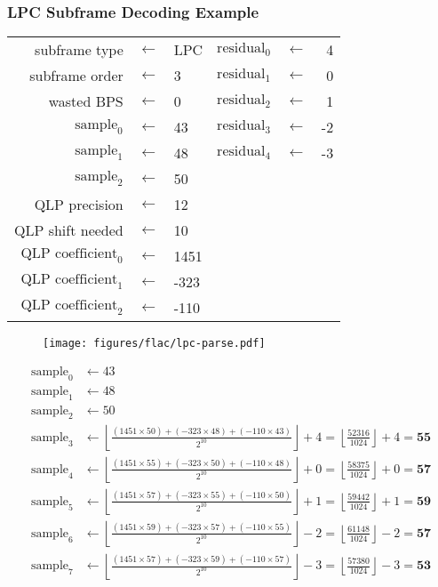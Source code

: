 \subsubsection{LPC Subframe Decoding Example}

\begin{tabular}{rcl|rcr}
subframe type & $\leftarrow$ & LPC &
$\text{residual}_0$ & $\leftarrow$ & 4 \\
subframe order & $\leftarrow$ & 3 &
$\text{residual}_1$ & $\leftarrow$ & 0 \\
wasted BPS & $\leftarrow$ & 0 &
$\text{residual}_2$ & $\leftarrow$ & 1 \\
$\text{sample}_0$ & $\leftarrow$ & 43 &
$\text{residual}_3$ & $\leftarrow$ & -2 \\
$\text{sample}_1$ & $\leftarrow$ & 48 &
$\text{residual}_4$ & $\leftarrow$ & -3 \\
$\text{sample}_2$ & $\leftarrow$ & 50 & & & \\
QLP precision & $\leftarrow$ & 12 & & & \\
QLP shift needed & $\leftarrow$ & 10 & & & \\
$\text{QLP coefficient}_0$ & $\leftarrow$ & 1451 & & & \\
$\text{QLP coefficient}_1$ & $\leftarrow$ & -323 & & & \\
$\text{QLP coefficient}_2$ & $\leftarrow$ & -110 & & & \\
\end{tabular}

\clearpage

\begin{figure}[h]
\texttt{[image: figures/flac/lpc-parse.pdf]}
\end{figure}
\begin{align*}
\text{sample}_0 &\leftarrow 43 \\
\text{sample}_1 &\leftarrow 48 \\
\text{sample}_2 &\leftarrow 50 \\
\text{sample}_3 &\leftarrow \left\lfloor\frac{(1451 \times 50) + (-323 \times 48) + (-110 \times 43)}{2 ^ {10}}\right\rfloor + 4 = \left\lfloor\frac{52316}{1024}\right\rfloor + 4 = \textbf{55} \\
\text{sample}_4 &\leftarrow \left\lfloor\frac{(1451 \times 55) + (-323 \times 50) + (-110 \times 48)}{2 ^ {10}}\right\rfloor + 0 = \left\lfloor\frac{58375}{1024}\right\rfloor + 0 = \textbf{57} \\
\text{sample}_5 &\leftarrow \left\lfloor\frac{(1451 \times 57) + (-323 \times 55) + (-110 \times 50)}{2 ^ {10}}\right\rfloor + 1 = \left\lfloor\frac{59442}{1024}\right\rfloor + 1 = \textbf{59} \\
\text{sample}_6 &\leftarrow \left\lfloor\frac{(1451 \times 59) + (-323 \times 57) + (-110 \times 55)}{2 ^ {10}}\right\rfloor - 2 = \left\lfloor\frac{61148}{1024}\right\rfloor - 2 = \textbf{57} \\
\text{sample}_7 &\leftarrow \left\lfloor\frac{(1451 \times 57) + (-323 \times 59) + (-110 \times 57)}{2 ^ {10}}\right\rfloor - 3 = \left\lfloor\frac{57380}{1024}\right\rfloor - 3 = \textbf{53} \\
\end{align*}

